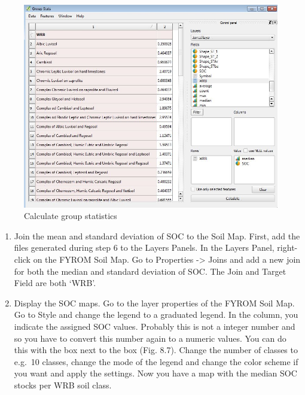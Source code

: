 \documentclass[10pt,b5paper,]{book}
\providecommand{\tightlist}{%
  \setlength{\itemsep}{0pt}\setlength{\parskip}{0pt}}
\theoremstyle{definition}
\theoremstyle{definition}
\theoremstyle{definition}
\theoremstyle{remark}
\begin{document}
\begin{figure}

{\centering \includegraphics[width=0.8\linewidth]{images/Conv_upscaling6} 

}

\caption{Calculate group statistics}\label{fig:unnamed-chunk-28}
\end{figure}

\begin{enumerate}
\def\labelenumi{\arabic{enumi}.}
\setcounter{enumi}{6}
\tightlist
\item
  Join the mean and standard deviation of SOC to the Soil Map. First,
  add the files generated during step 6 to the Layers Panels. In the
  Layers Panel, right-click on the FYROM Soil Map. Go to Properties
  -\textgreater{} Joins and add a new join for both the median and
  standard deviation of SOC. The Join and Target Field are both `WRB'.
\item
  Display the SOC maps. Go to the layer properties of the FYROM Soil
  Map. Go to Style and change the legend to a graduated legend. In the
  column, you indicate the assigned SOC values. Probably this is not a
  integer number and so you have to convert this number again to a
  numeric values. You can do this with the box next to the box (Fig.
  8.7). Change the number of classes to e.g.~10 classes, change the mode
  of the legend and change the color scheme if you want and apply the
  settings. Now you have a map with the median SOC stocks per WRB soil
  class.
\end{enumerate}
\end{document}
